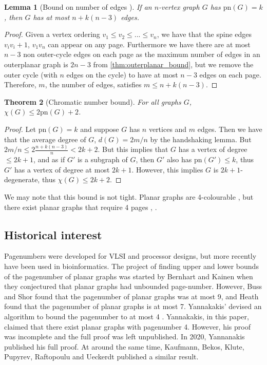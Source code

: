 \documentclass[]{report}
\newcommand{\pn}{\text{pn}}
\newtheorem{theorem}{Theorem}
\newtheorem{lemma}[theorem]{Lemma}
\theoremstyle{definition}
\numberwithin{theorem}{section}
\numberwithin{equation}{section}
\begin{document}
\begin{lemma}[Bound on number of edges \cite{bernhartBookThicknessGraph1979}]\label{lem:Edge_Bound}
	If an $n$-vertex graph $G$ has $\pn(G) = k$, then $G$ has at most $n + k(n-3)$ edges.
\end{lemma}
\begin{proof}
	Given a vertex ordering $v_1 \leq v_2 \leq ... \leq v_n$, we have that the spine edges $v_i v_i+1$, $v_1 v_n$  can appear on any page. Furthermore we have there are at most $n-3$ non outer-cycle edges on each page as the maximum number of edges in an outerplanar graph is $2n - 3$ from \cref{thm:outerplanar_bound}, but we remove the outer cycle (with $n$ edges on the cycle) to have at most $n-3$ edges on each page. Therefore, $m$, the number of edges, satisfies $m \leq n + k (n - 3)$. 
\end{proof}
\begin{theorem}[Chromatic number bound\cite{bernhartBookThicknessGraph1979}]\label{thm:Colouring_Bound}
	For all graphs $G$, $\chi(G) \leq 2 \pn(G) + 2$.
\end{theorem}
\begin{proof}
	Let $\pn(G) = k$ and suppose $G$ has $n$ vertices and $m$ edges. Then we have that the average degree of $G$, $d(G) = 2m/n$ by the handshaking lemma. But $2m/n \leq 2 \frac{n + k(n-3)}{n} < 2k + 2$. But this implies that $G$ has a vertex of degree $\leq 2k + 1$, and as if $G'$ is a subgraph of $G$, then $G'$ also has $\pn(G') \leq k$, thus $G'$ has a vertex of degree at most $2k + 1$. However, this implies $G$ is $2k + 1$-degenerate, thus $\chi(G) \leq 2k + 2$. 
\end{proof}
We may note that this bound is not tight. Planar graphs are 4-colourable \cite{appelEveryPlanarMap1989}, but there exist planar graphs that require 4 pages \cite{yannakakisPlanarGraphsThat2020}, \cite{kaufmannFourPagesAre2020}. 

\subsection{Historical interest}\label{ssec:Pagenumber_History}
Pagenumbers were developed for VLSI and processor designs, but more recently have been used in bioinformatics.
The project of finding upper and lower bounds of the pagenumber of planar graphs was started by Bernhart and Kainen when they conjectured that planar graphs had unbounded page-number. However, Buss and Shor\cite{bussPagenumberPlanarGraphs1984} found that the pagenumber of planar graphs was at most 9, and Heath \cite{heathEmbeddingPlanarGraphs1984} found that the pagenumber of planar graphs is at most 7. Yannakakis' devised an algorithm to bound the pagenumber to at most 4 \cite{yannakakisEmbeddingPlanarGraphs1989}. Yannakakis, in this paper, claimed that there exist planar graphs with pagenumber 4. However, his proof was incomplete and the full proof was left unpublished. In 2020, Yannanakis published his full proof. \cite{yannakakisPlanarGraphsThat2020} At around the same time, Kaufmann, Bekos, Klute, Pupyrev, Raftopoulu and Ueckerdt published a similar result\cite{kaufmannFourPagesAre2020}. 
\end{document}
